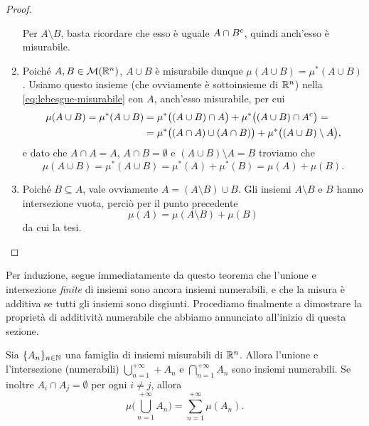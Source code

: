 \begin{proof}
\begin{enumerate}
			Per $A\setminus B$, basta ricordare che esso è uguale $A\cap{B}^c$, quindi anch'esso è misurabile.
		\item Poich\'e $A,B\in\mathcal M(\mathbb{R}^n)$, $A\cup B$ è misurabile dunque $\mu(A\cup B)=\mu^*(A\cup B)$.
			Usiamo questo insieme (che ovviamente è sottoinsieme di $\mathbb{R}^n$) nella \eqref{eq:lebesgue-misurabile} con $A$, anch'esso misurabile, per cui
			\begin{equation}
				\begin{split}
					\mu(A\cup B)=\mu^*(A\cup B)&=\mu^*\big((A\cup B)\cap A\big)+\mu^*\big((A\cup B)\cap{A}^c\big)=\\
					&=\mu^*\big((A\cap A)\cup(A\cap B)\big)+\mu^*\big((A\cup B)\setminus A\big),
				\end{split}
			\end{equation}
			e dato che $A\cap A=A$, $A\cap B=\emptyset$ e $(A\cup B)\setminus A=B$ troviamo che
			\begin{equation}
				\mu(A\cup B)=\mu^*(A\cup B)=\mu^*(A)+\mu^*(B)=\mu(A)+\mu(B).
			\end{equation}
		\item Poich\'e $B\subseteq A$, vale ovviamente $A=(A\setminus B)\cup B$.
			Gli insiemi $A\setminus B$ e $B$ hanno intersezione vuota, perciò per il punto precedente
			\begin{equation}
				\mu(A)=\mu(A\setminus B)+\mu(B)
			\end{equation}
			da cui la tesi.
	\end{enumerate}
\end{proof}
Per induzione, segue immediatamente da questo teorema che l'unione e intersezione \emph{finite} di insiemi sono ancora insiemi numerabili, e che la misura è additiva se tutti gli insiemi sono disgiunti.
Procediamo finalmente a dimostrare la proprietà di additività numerabile che abbiamo annunciato all'inizio di questa sezione.
\begin{proprieta} \label{pr:additivita-numerabile-lebesgue}
	Sia $\{A_n\}_{n\in\mathbb{N}}$ una famiglia di insiemi misurabili di $\mathbb{R}^n$.
	Allora l'unione e l'intersezione (numerabili) $\bigcup_{n=1}^{+\infty}+A_n$ e $\bigcap_{n=1}^{+\infty}A_n$ sono insiemi numerabili.
	Se inoltre $A_i\cap A_j=\emptyset$ per ogni $i\neq j$, allora
	\begin{equation}
		\mu\bigg(\bigcup_{n=1}^{+\infty}A_n\bigg)=\sum_{n=1}^{+\infty}\mu(A_n).
		\label{eq:additivita-numerabile-lebesgue}
	\end{equation}
\end{proprieta}

